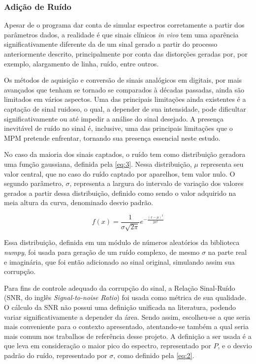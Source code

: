 \documentclass[
12pt,		
twoside, 
a4paper,
chapter=TITLE,
english,			
brazil]{USPSC-classe/USPSC}
\begin{document}
\subsubsection{Adição de Ruído}
Apesar de o programa dar conta de simular espectros corretamente a partir dos parâmetros dados, a realidade é que sinais clínicos \textit{in vivo} tem uma aparência significativamente 
diferente da de um sinal gerado a partir do processo anteriormente descrito, principalmente por conta das distorções geradas por, por exemplo, alargamento de linha, ruído, entre outros. 

Os métodos de aquisição e conversão de sinais analógicos em digitais, por mais avançados que tenham se tornado se comparados à décadas passadas, ainda são limitados em vários aspectos. Uma das principais 
limitações ainda existentes é a captação de sinal ruidoso, o qual, a depender de sua intensidade, pode dificultar significativamente ou até impedir a análise do sinal desejado. A presença 
inevitável de ruído no sinal é, inclusive, uma das principais limitações que o MPM pretende enfrentar, tornando sua presença essencial neste estudo. 

No caso da maioria dos sinais captados, o ruído tem como distribuição geradora uma função gaussiana, definida pela \autoref{eq:3}. Nessa distribuição, $\mu$ representa seu valor central, 
que no caso do ruído captado por aparelhos, tem valor nulo. O segundo parâmetro, $\sigma$, representa a largura do intervalo de variação dos valores gerados a partir dessa 
distribuição, definido como sendo o valor adquirido na meia altura da curva, denominado desvio padrão.


\begin{equation} \label{eq:3}
    f(x) = \frac{1}{\sigma \sqrt{2\pi}}e^{-\frac{(x - \mu)^2}{2\sigma ^2}}
\end{equation}

Essa distribuição, definida em um módulo de números aleatórios da biblioteca \textit{numpy}, foi usada para geração de um ruído complexo, de mesmo $\sigma$ na parte real e imaginária, que foi então adicionado ao sinal original, simulando assim sua
corrupção.

Para fins de controle adequado da corrupção do sinal, a Relação Sinal-Ruído (SNR, do inglês \textit{Signal-to-noise Ratio}) foi usada como métrica de sua qualidade. O cálculo da SNR não possui uma definição unificada na literatura, podendo variar significativamente a depender da área. Sendo assim, 
escolheu-se a que seria mais conveniente para o contexto apresentado, atentando-se também a qual seria mais comum nos trabalhos de referência desse projeto. A definição a ser usada é a que 
leva em consideração o maior pico do espectro, representado por $P$, e o desvio padrão do ruído, representado por $\sigma$, como definido pela \autoref{eq:2}.  
\end{document}
